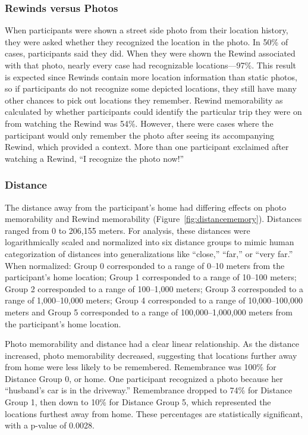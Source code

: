 \documentclass{sigchi}
\begin{document}
\subsubsection{Rewinds versus Photos}
When participants were shown a street side photo from their location history, they were asked whether they recognized the location in the photo. In 50\% of cases, participants said they did. When they were shown the Rewind associated with that photo, nearly every case had recognizable locations---97\%. This result is expected since Rewinds contain more location information than static photos, so if participants do not recognize some depicted locations, they still have many other chances to pick out locations they remember. Rewind memorability as calculated by whether participants could identify the particular trip they were on from watching the Rewind was 54\%. However, there were cases where the participant would only remember the photo after seeing its accompanying Rewind, which provided a context. More than one participant exclaimed after watching a Rewind, ``I recognize the photo now!''

\subsubsection{Distance}
The distance away from the participant’s home had differing effects on photo memorability and Rewind memorability (Figure~\ref{fig:distancememory}). Distances ranged from 0 to 206,155 meters. For analysis, these distances were logarithmically scaled and normalized into six distance groups to mimic human categorization of distances into generalizations like ``close,'' ``far,'' or ``very far.'' When normalized: Group 0 corresponded to a range of 0--10 meters from the participant's home location; Group 1 corresponded to a range of 10--100 meters; Group 2 corresponded to a range of 100--1,000 meters; Group 3 corresponded to a range of 1,000--10,000 meters; Group 4 corresponded to a range of 10,000--100,000 meters and Group 5 corresponded to a range of 100,000--1,000,000 meters from the participant's home location. 

Photo memorability and distance had a clear linear relationship. As the distance increased, photo memorability decreased, suggesting that locations further away from home were less likely to be remembered. Remembrance was 100\% for Distance Group 0, or home. One participant recognized a photo because her ``husband's car is in the driveway.'' Remembrance dropped to 74\% for Distance Group 1, then down to 10\% for Distance Group 5, which represented the locations furthest away from home. These percentages are statistically significant, with a p-value of 0.0028. 
\end{document}

